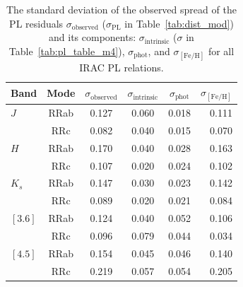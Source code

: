 \documentclass[a4paper,fleqn,usenatbib]{mnras}
\begin{document}
\begin{table}
\centering
\caption{The standard deviation of the observed spread of the PL residuals $\sigma_{\text{observed}}$ ($\sigma_{\text{PL}}$ in Table~\ref{tab:dist_mod}) and its components: $\sigma_{\text{intrinsic}}$ ($\sigma$ in Table~\ref{tab:pl_table_m4}), $\sigma_{\text{phot}}$, and $\sigma_{[\text{Fe/H}]}$ for all IRAC PL relations.}
\label{tab:metallicity_sigma}
\begin{tabular}{lccccr} 
\hline \hline
Band & Mode & $\sigma_{\text{observed}}$ & $\sigma_{\text{intrinsic}}$ & $\sigma_{\text{phot}}$ & $\sigma_{[\text{Fe/H}]}$ \\
\hline
$J$ & RRab & 0.127 & 0.060 & 0.018 & 0.111 \\
  & RRc & 0.082 & 0.040 & 0.015 & 0.070 \\
$H$ & RRab & 0.170 & 0.040 & 0.028 & 0.163 \\
  & RRc & 0.107 & 0.020 & 0.024 & 0.102 \\
$K_s$ & RRab & 0.147 & 0.030 & 0.023 & 0.142 \\
  & RRc & 0.089 & 0.020 & 0.021 & 0.084 \\
$[3.6]$  & RRab & 0.124 & 0.040 & 0.052 & 0.106 \\
  & RRc & 0.096 & 0.079 & 0.044 & 0.034 \\
$[4.5]$& RRab & 0.154 & 0.045 & 0.046 & 0.140 \\
  & RRc & 0.219 & 0.057 & 0.054 & 0.205 \\
\hline
\end{tabular}
\end{table}

\end{document}
